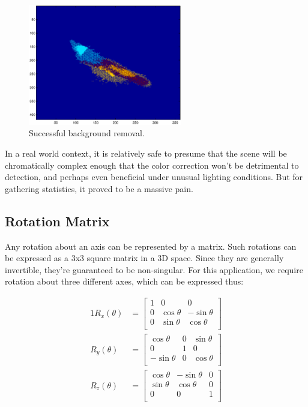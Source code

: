 \begin{figure}[h!]
  \centering
    \includegraphics[width=0.60\textwidth]{Chapter2/Figs/xy_bg_success.eps}
    \caption{Successful background removal.}  \label{fig:BGSuccess}
\end{figure}

In a real world context, it is relatively safe to presume that the scene will be chromatically complex enough that the color correction won't be detrimental to detection, and perhaps even beneficial under unusual lighting conditions. But for gathering statistics, it proved to be a massive pain.

\subsection{Rotation Matrix}\label{sec:RotationMatrix}
Any rotation about an axis can be represented by a matrix. Such rotations can be expressed as a 3x3 square matrix in a 3D space. Since they are generally invertible, they're guaranteed to be non-singular. For this application, we require rotation about three different axes, which can be expressed thus:


\begin{alignat}{1}
R_x(\theta) &= \begin{bmatrix}
1 & 0 & 0 \\
0 & \cos \theta &  -\sin \theta \\[3pt]
0 & \sin \theta  &  \cos \theta \\[3pt]
\end{bmatrix} \\[6pt]
R_y(\theta) &= \begin{bmatrix}
\cos \theta & 0 & \sin \theta \\[3pt]
0 & 1 & 0 \\[3pt]
-\sin \theta & 0 & \cos \theta \\
\end{bmatrix} \\[6pt]
R_z(\theta) &= \begin{bmatrix}
\cos \theta &  -\sin \theta & 0 \\[3pt]
\sin \theta & \cos \theta & 0\\[3pt]
0 & 0 & 1\\
\end{bmatrix}
\end{alignat}


